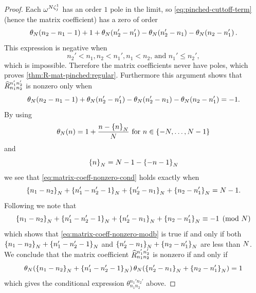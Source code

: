 \documentclass{sl2ams}
\numberwithin{equation}{section}
\begin{document}
\begin{proof}
    Each \(\omega^{N \zeta_j^1}\) has an order \(1\) pole in the limit, so \eqref{eq:pinched-cuttoff-term} (hence the matrix coefficient) has a zero of order 
    \begin{equation}
      \label{eq:matrix-coeff-zero-order}
      \theta_{N}\mathopen{}\left(n_2 - n_1 - 1\right)
      +
      1
      +
      \theta_{N}\mathopen{}\left(n_2' - n_1'\right)
      -
      \theta_{N}\mathopen{}\left(n_2' - n_1\right)
      -
      \theta_{N}\mathopen{}\left(n_2 - n_1'\right).
    \end{equation}
    This expression is negative when
    \[
      n_2' < n_1, n_2 < n_1', n_1 < n_2 \text{, and } n_1' \le n_2',
    \]
    which is impossible.
    Therefore the matrix coefficients never have poles, which proves \ref{thm:R-mat-pinched:regular}.
    Furthermore this argument shows that \(\rmat{n_1}{n_2}{n_1'}{n_2'}\) is nonzero only when
    \begin{equation}
      \label{eq:matrix-coeff-nonzero-cond}
      \theta_{N}\mathopen{}\left(n_2 - n_1 - 1\right)
      +
      \theta_{N}\mathopen{}\left(n_2' - n_1'\right)
      -
      \theta_{N}\mathopen{}\left(n_2' - n_1\right)
      -
      \theta_{N}\mathopen{}\left(n_2 - n_1'\right)
      =
      -1.
    \end{equation}
    By using
    \[
      \cutoff{n} = 1 + \frac{n - \modb{n}}{\nr} \text{ for } n \in \set{-\nr, \dots, \nr -1}
    \]
    and
    \[
      \left\{n\right\}_{N} = N - 1 - \left\{-n - 1\right\}_{N}
    \]
    we see that \eqref{eq:matrix-coeff-nonzero-cond} holds exactly when
    \begin{equation}
      \label{eq:matrix-coeff-nonzero-modb}
      \left\{n_1 - n_2\right\}_{N} + \left\{n_1' - n_2' -1\right\}_{N} + \left\{n_2' - n_1\right\}_{N} + \left\{n_2 - n_1'\right\}_{N} = N -1.
    \end{equation}
    Following \cite[Section 4.1]{Murakami2018} we note that
    \[
      \left\{n_1 - n_2\right\}_{N} + \left\{n_1' - n_2' -1\right\}_{N} + \left\{n_2' - n_1\right\}_{N} + \left\{n_2 - n_1'\right\}_{N} \equiv -1 \pmod{N}
    \]
    which shows that \cref{eq:matrix-coeff-nonzero-modb} is true if and only if both
    \(
    \left\{n_1 - n_2\right\}_{N} + \left\{n_1' - n_2' -1\right\}_{N}
    \)
    and
    \(
    \left\{n_2' - n_1\right\}_{N} + \left\{n_2 - n_1'\right\}_{N}
    \)
    are less than \(N\).
    We conclude that the matrix coefficient \(\rmat{n_1}{n_2}{n_1'}{n_2'}\) is nonzero if and only if
    \[
      \theta_{N}\mathopen{}\left(
        \left\{n_1 - n_2\right\}_{N} + \left\{n_1' - n_2' -1\right\}_{N}
      \right)
      \theta_{N}\mathopen{}\left(
        \left\{n_2' - n_1\right\}_{N} + \left\{n_2 - n_1'\right\}_{N}
      \right)
      =
      1
    \]
    which gives the conditional expression \(\theta_{n_1 n_2}^{n_1' n_2'}\) above.
  

\end{proof}
\end{document}
